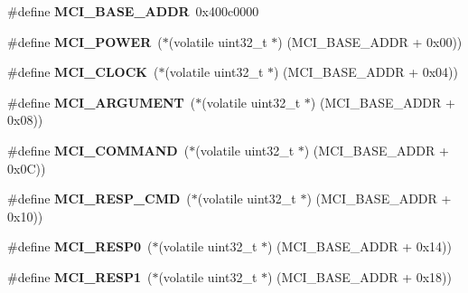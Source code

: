 \begin{DoxyCompactItemize}
\mbox{\label{group__lpc24xx__regs_ga3eaa1133c73ec24549c7109051b7d561}} 
\#define {\bfseries M\+C\+I\+\_\+\+B\+A\+S\+E\+\_\+\+A\+D\+DR}~0x400c0000
\item 
\mbox{\label{group__lpc24xx__regs_gabb94916a0c9833cff9ba76999745b92e}} 
\#define {\bfseries M\+C\+I\+\_\+\+P\+O\+W\+ER}~($\ast$(volatile uint32\+\_\+t $\ast$) (M\+C\+I\+\_\+\+B\+A\+S\+E\+\_\+\+A\+D\+DR + 0x00))
\item 
\mbox{\label{group__lpc24xx__regs_ga2be4c26ae4c3e91a79ff0d3feec65c27}} 
\#define {\bfseries M\+C\+I\+\_\+\+C\+L\+O\+CK}~($\ast$(volatile uint32\+\_\+t $\ast$) (M\+C\+I\+\_\+\+B\+A\+S\+E\+\_\+\+A\+D\+DR + 0x04))
\item 
\mbox{\label{group__lpc24xx__regs_ga3601f39e62013944b96bf2a09fb9cb82}} 
\#define {\bfseries M\+C\+I\+\_\+\+A\+R\+G\+U\+M\+E\+NT}~($\ast$(volatile uint32\+\_\+t $\ast$) (M\+C\+I\+\_\+\+B\+A\+S\+E\+\_\+\+A\+D\+DR + 0x08))
\item 
\mbox{\label{group__lpc24xx__regs_ga54ac6141113d0d51c1d6e9af3cec1217}} 
\#define {\bfseries M\+C\+I\+\_\+\+C\+O\+M\+M\+A\+ND}~($\ast$(volatile uint32\+\_\+t $\ast$) (M\+C\+I\+\_\+\+B\+A\+S\+E\+\_\+\+A\+D\+DR + 0x0\+C))
\item 
\mbox{\label{group__lpc24xx__regs_gaced0f1b4d5a3065ce9bf5e6579f1ffbd}} 
\#define {\bfseries M\+C\+I\+\_\+\+R\+E\+S\+P\+\_\+\+C\+MD}~($\ast$(volatile uint32\+\_\+t $\ast$) (M\+C\+I\+\_\+\+B\+A\+S\+E\+\_\+\+A\+D\+DR + 0x10))
\item 
\mbox{\label{group__lpc24xx__regs_ga8596dabfec8cf8c689956d282fd819ff}} 
\#define {\bfseries M\+C\+I\+\_\+\+R\+E\+S\+P0}~($\ast$(volatile uint32\+\_\+t $\ast$) (M\+C\+I\+\_\+\+B\+A\+S\+E\+\_\+\+A\+D\+DR + 0x14))
\item 
\mbox{\label{group__lpc24xx__regs_ga30dd54ee3b147f1c3b9fa5ddaf83eb4b}} 
\#define {\bfseries M\+C\+I\+\_\+\+R\+E\+S\+P1}~($\ast$(volatile uint32\+\_\+t $\ast$) (M\+C\+I\+\_\+\+B\+A\+S\+E\+\_\+\+A\+D\+DR + 0x18))
\item 
\mbox{\label{group__lpc24xx__regs_gaa7958ba21370ed742290f5a961bb2de4}} 

\end{DoxyCompactItemize}
